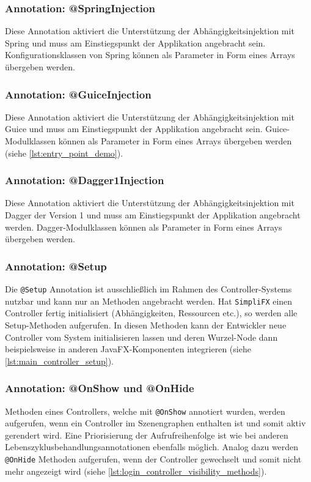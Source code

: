 \subsubsection{Annotation: @SpringInjection}
Diese Annotation aktiviert die Unterstützung der Abhängigkeitsinjektion mit Spring und muss am Einstiegspunkt der Applikation angebracht sein. Konfigurationsklassen von Spring können als Parameter in Form eines Arrays übergeben werden.
\subsubsection{Annotation: @GuiceInjection}
Diese Annotation aktiviert die Unterstützung der Abhängigkeitsinjektion mit Guice und muss am Einstiegspunkt der Applikation angebracht sein. Guice-Modulklassen können als Parameter in Form eines Arrays übergeben werden (siehe \autoref{lst:entry_point_demo}).
\subsubsection{Annotation: @Dagger1Injection}
Diese Annotation aktiviert die Unterstützung der Abhängigkeitsinjektion mit Dagger der Version 1 und muss am Einstiegspunkt der Applikation angebracht werden. Dagger-Modulklassen können als Parameter in Form eines Arrays übergeben werden.
\subsubsection{Annotation: @Setup}
Die \texttt{@Setup} Annotation ist ausschließlich im Rahmen des Controller-Systems nutzbar und kann nur an Methoden angebracht werden. Hat \texttt{SimpliFX} einen Controller fertig initialisiert (Abhängigkeiten, Ressourcen etc.), so werden alle Setup-Methoden aufgerufen. In diesen Methoden kann der Entwickler neue Controller vom System initialisieren lassen und deren Wurzel-Node dann beispielsweise in anderen JavaFX-Komponenten integrieren (siehe \autoref{lst:main_controller_setup}).
\subsubsection{Annotation: @OnShow und @OnHide}
Methoden eines Controllers, welche mit \texttt{@OnShow} annotiert wurden, werden aufgerufen, wenn ein Controller im Szenengraphen enthalten ist und somit aktiv gerendert wird. Eine Priorisierung der Aufrufreihenfolge ist wie bei anderen Lebenszyklusbehandlungsannotationen ebenfalls möglich. Analog dazu werden \texttt{@OnHide} Methoden aufgerufen, wenn der Controller gewechselt und somit nicht mehr angezeigt wird (siehe \autoref{lst:login_controller_visibility_methods}).
